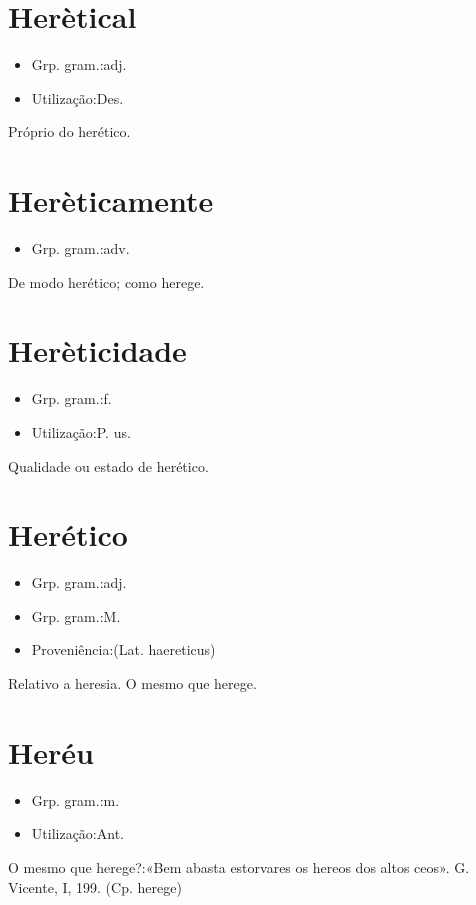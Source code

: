 \documentclass{article}
\begin{document}
\section{Herètical}
\begin{itemize}
\item {Grp. gram.:adj.}
\end{itemize}
\begin{itemize}
\item {Utilização:Des.}
\end{itemize}
Próprio do herético.
\section{Herèticamente}
\begin{itemize}
\item {Grp. gram.:adv.}
\end{itemize}
De modo herético; como herege.
\section{Herèticidade}
\begin{itemize}
\item {Grp. gram.:f.}
\end{itemize}
\begin{itemize}
\item {Utilização:P. us.}
\end{itemize}
Qualidade ou estado de herético.
\section{Herético}
\begin{itemize}
\item {Grp. gram.:adj.}
\end{itemize}
\begin{itemize}
\item {Grp. gram.:M.}
\end{itemize}
\begin{itemize}
\item {Proveniência:(Lat. \textunderscore haereticus\textunderscore )}
\end{itemize}
Relativo a heresia.
O mesmo que \textunderscore herege\textunderscore .
\section{Heréu}
\begin{itemize}
\item {Grp. gram.:m.}
\end{itemize}
\begin{itemize}
\item {Utilização:Ant.}
\end{itemize}
O mesmo que \textunderscore herege\textunderscore ?:«\textunderscore Bem abasta estorvares os hereos dos altos ceos\textunderscore ». G. Vicente, I, 199.
(Cp. \textunderscore herege\textunderscore )
\end{document}
